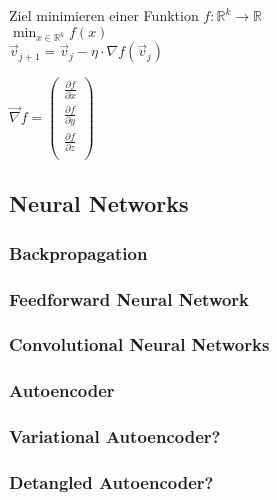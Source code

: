 \documentclass[../main]{subfiles}
\begin{document}
Ziel minimieren einer Funktion $\mathit{f}: \mathbb{R}^k \to \mathbb{R}$\\
$\displaystyle\min_{x\in \mathbb{R}^k}f(x)$\\

$\vec{v}_{j+1} = \vec{v}_j - \eta \cdot \nabla \mathit{f}(\vec{v}_j)$

$\vec{\nabla} f = 
 \begin{pmatrix}
     \frac{\partial f}{\partial x} \\[6pt]
     \frac{\partial f}{\partial y} \\[6pt]
     \frac{\partial f}{\partial z} \\
 \end{pmatrix}$

\subsection{Neural Networks}
\subsubsection{Backpropagation}
\subsubsection{Feedforward Neural Network}
\subsubsection{Convolutional Neural Networks}
\subsubsection{Autoencoder}
\subsubsection{Variational Autoencoder?}
\subsubsection{Detangled Autoencoder?}
\end{document}
